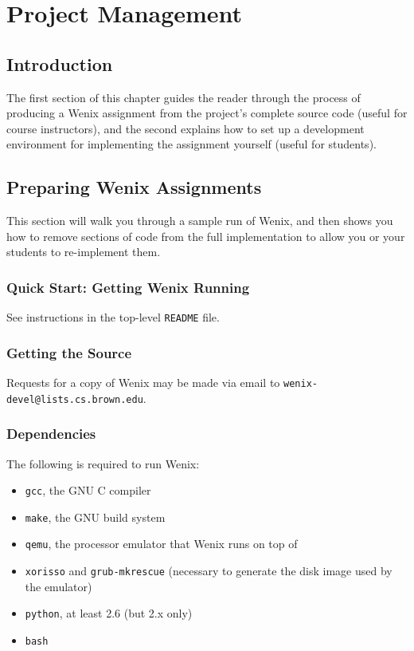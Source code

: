 \chapter{Project Management}
\label{project-management}

\section{Introduction}

The first section of this chapter guides the reader through the process of producing a Wenix assignment from the project's complete source code (useful for course instructors), and the second explains how to set up a development environment for implementing the assignment yourself (useful for students).

\section{Preparing Wenix Assignments}

This section will walk you through a sample run of Wenix, and then shows you how to remove sections of code from the full implementation to allow you or your students to re-implement them.

\subsection{Quick Start: Getting Wenix Running} \label{quickstart}

See instructions in the top-level \texttt{README} file.


\subsection{Getting the Source}
Requests for a copy of Wenix may be made via email to \texttt{wenix-devel@lists.cs.brown.edu}.
\subsection{Dependencies}
The following is required to run Wenix:

\begin{itemize}
\item \texttt{gcc}, the GNU C compiler %
\item \texttt{make}, the GNU build system
\item \texttt{qemu},%
the processor emulator that Wenix runs on top of
\item \texttt{xorisso} and \texttt{grub-mkrescue} (necessary to generate the disk image used by the emulator)
\item \texttt{python}, at least 2.6 (but 2.x only)
\item \texttt{bash}
\end{itemize}

